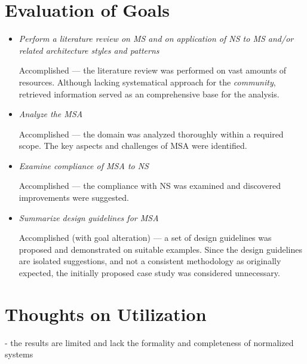 \documentclass[thesis=M,english,hidelinks]{FITthesis}[2012/10/20]
\begin{document}
\section{Evaluation of Goals}
\begin{itemize}

	\item \textit{Perform a literature review on \acrshort{MS} and on application of \acrshort{NS} to \acrshort{MS} and/or related architecture styles and patterns}
	
	\vspace{0.5em}
	Accomplished --- the literature review was performed on vast amounts of resources. Although lacking systematical approach for the \textit{community}, retrieved information served as an comprehensive base for the analysis.
	
	\item \textit{Analyze the \acrlong{MSA}}
	
	\vspace{0.5em}
    Accomplished --- the domain was analyzed thoroughly within a required scope. The key aspects and challenges of \acrlong{MSA} were identified.

	\item \textit{Examine compliance of \acrlong{MSA} to \acrlong{NS}}

	\vspace{0.5em}	
	Accomplished --- the compliance with \acrlong{NS} was examined and discovered improvements were suggested.

	\item \textit{Summarize design guidelines for \acrshort{MSA}}
	
	\vspace{0.5em}
	Accomplished (with goal alteration) --- a set of design guidelines was proposed and demonstrated on suitable examples. Since the design guidelines are isolated suggestions, and not a consistent methodology as originally expected, the initially proposed case study was considered unnecessary. 

\end{itemize}

\section{Thoughts on Utilization}


- the results are limited and lack the formality and completeness of normalized systems
\end{document}
